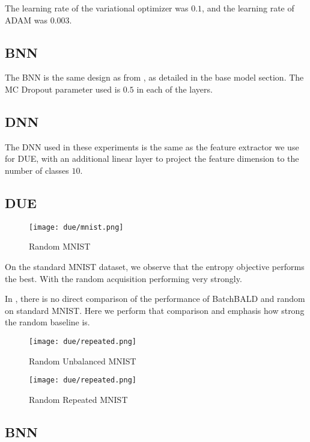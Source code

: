\documentclass[12pt, a4paper]{report}
\theoremstyle{definition}
\theoremstyle{definition}
\theoremstyle{definition}
\begin{document}
The learning rate of the variational optimizer was $0.1$, and the learning rate of ADAM was $0.003$.

\subsection{BNN}

The BNN is the same design as from \cite{kirsch2019batchbald}, as detailed in the base model section. The MC Dropout parameter used is $0.5$ in each of the layers.

\subsection{DNN}

The DNN used in these experiments is the same as the feature extractor we use for DUE, with an additional linear layer to project the feature dimension to the number of classes $10$.



\subsection{DUE}

\begin{figure}[H]
\centering
\texttt{[image: due/mnist.png]}
\caption{Random MNIST}
\end{figure}

On the standard MNIST dataset, we observe that the entropy objective performs the best. With the random acquisition performing very strongly.

In \cite{kirsch2019batchbald}, there is no direct comparison of the performance of BatchBALD and random on standard MNIST. Here we perform that comparison and emphasis how strong the random baseline is.


\begin{figure}[H]
\centering
\texttt{[image: due/repeated.png]}
\caption{Random Unbalanced MNIST}
\end{figure}

\begin{figure}[H]
\centering
\texttt{[image: due/repeated.png]}
\caption{Random Repeated MNIST}
\end{figure}

\subsection{BNN}
\end{document}
